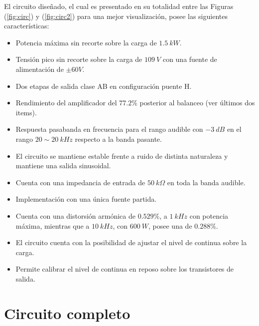 
El circuito diseñado, el cual es presentado en su totalidad entre las Figuras (\ref{fig:circ}) y (\ref{fig:circ2}) para una mejor visualización, posee las siguientes características:
\begin{itemize}
\item Potencia máxima sin recorte sobre la carga de $1.5 \ kW$.
\item Tensión pico sin recorte sobre la carga de $109 \ V$ con una fuente de alimentación de $\pm 60V$.
\item Dos etapas de salida clase AB en configuración puente H.
\item Rendimiento del amplificador del $77.2\%$ posterior al balanceo (ver últimos dos items).
\item Respuesta pasabanda en frecuencia para el rango audible con $-3 \ dB$ en el rango $20 \sim 20 \ kHz$ respecto a la banda pasante.
\item El circuito se mantiene estable frente a ruido de distinta naturaleza y mantiene una salida sinusoidal.
\item Cuenta con una impedancia de entrada de $50 \ k\Omega$ en toda la banda audible.
\item Implementación con una única fuente partida.
\item Cuenta con una distorsión armónica de $0.529 \%$, a $1 \ kHz$ con potencia máxima, mientras que a $10 \ kHz$, con $600 \ W$, posee una de $0.288\%$.
\item El circuito cuenta con la posibilidad de ajustar el nivel de continua sobre la carga.
\item Permite calibrar el nivel de continua en reposo sobre los transistores de salida.
\end{itemize}

\newpage

\section{Circuito completo}

